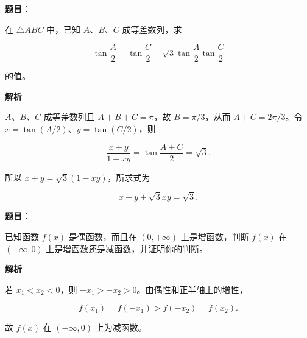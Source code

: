 \begin{answer}

\textbf{题目}：

在 $\triangle ABC$ 中，已知 $A\text{、}B\text{、}C$ 成等差数列，求

\nopagebreak[4]
\[
\tan\frac A2+\tan\frac C2+\sqrt3\tan\frac A2\tan\frac C2
\]

的值。

\textbf{解析}

$A\text{、}B\text{、}C$ 成等差数列且 $A+B+C=\pi$，故 $B=\pi/3$，从而 $A+C=2\pi/3$。令 $x=\tan(A/2)$、$y=\tan(C/2)$，则

\nopagebreak[4]
\[
\frac{x+y}{1-xy}=\tan\frac{A+C}{2}=\sqrt3.
\]

所以 $x+y=\sqrt3(1-xy)$，所求式为

\nopagebreak[4]
\[
x+y+\sqrt3xy=\sqrt3.
\]


\end{answer}
\begin{answer}

\textbf{题目}：

已知函数 $f(x)$ 是偶函数，而且在 $(0,+\infty)$ 上是增函数，判断 $f(x)$ 在 $(-\infty,0)$ 上是增函数还是减函数，并证明你的判断。

\textbf{解析}

若 $x_1<x_2<0$，则 $-x_1>-x_2>0$。由偶性和正半轴上的增性，

\nopagebreak[4]
\[
f(x_1)=f(-x_1)>f(-x_2)=f(x_2).
\]

故 $f(x)$ 在 $(-\infty,0)$ 上为减函数。


\end{answer}
